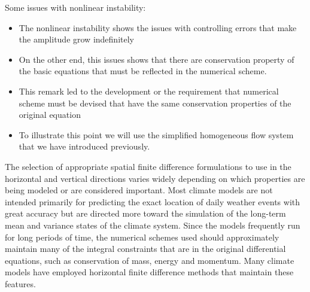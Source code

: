 Some issues with nonlinear instability:
\begin{itemize}
	\item The nonlinear instability shows the issues with controlling errors that make the amplitude grow indefinitely
	\item On the other end, this issues shows that there are conservation property of the basic equations that must be reflected in the numerical scheme.
	\item This remark led to the development or the requirement that numerical scheme must be devised that have the same conservation properties of the original equation
	\item To illustrate this point we will use the simplified homogeneous flow system that we have introduced previously.
\end{itemize}
The selection of appropriate spatial finite difference formulations to use in the horizontal and vertical directions varies widely depending on which properties are being modeled or are considered important. Most climate models are not intended primarily for predicting the exact location of daily weather events with great accuracy but are directed more toward the simulation of the long-term mean and variance states of the climate system. Since the models frequently run for long periods of time, the numerical schemes used should approximately maintain many of the integral constraints that are in the original differential equations, such as conservation of mass, energy and momentum. Many climate models have employed horizontal finite difference methods that maintain these features.

